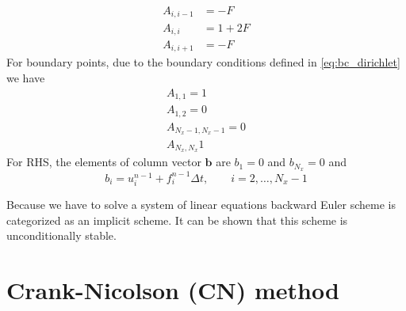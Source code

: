 \documentclass[a4paper,11pt]{article}
\begin{document}
\begin{align*}
A_{i,i-1} & = -F \\
A_{i,i}   & = 1 + 2F \\
A_{i,i+1} & = -F
\end{align*}
%
For boundary points, due to the boundary conditions defined in
\eqref{eq:bc_dirichlet} we have
%
\begin{align*}
A_{1,1} = 1 \\
A_{1,2} = 0 \\
A_{N_x-1,N_x-1} = 0 \\
A_{N_x,N_x} 1
\end{align*}
For RHS, the elements of column vector $\mathbf{b}$ are $b_{1} = 0$ and $b_{N_x} = 0$ and
\begin{equation}
b_{i} = u^{n-1}_{i} + f_{i}^{n-1} \Delta t, \qquad i = 2, \ldots, N_{x}-1
\end{equation}

Because we have to solve a system of linear equations backward Euler scheme is
categorized as an implicit scheme. It can be shown that this scheme is unconditionally
stable.


\section{Crank-Nicolson (CN) method}
\end{document}
